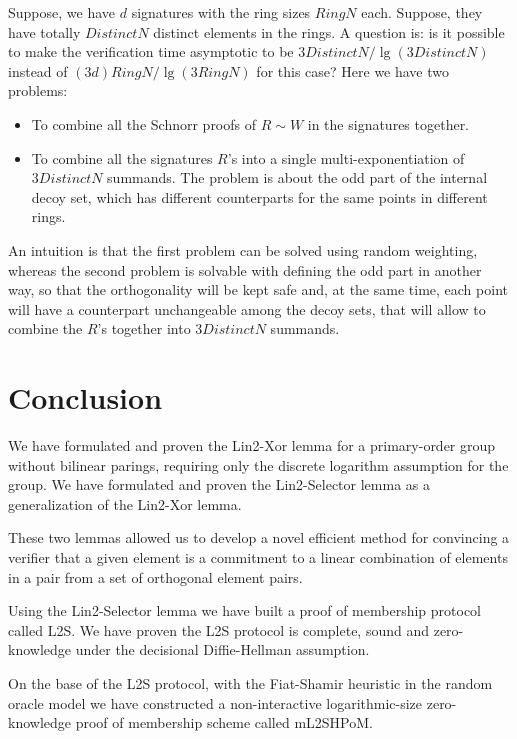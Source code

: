 \documentclass{mathcryptology} %
\newcommand{\RingN}{\textit{RingN}}
\theoremstyle{title}
\theoremstyle{titleof}
\begin{document}
    Suppose, we have $d$ signatures with the ring sizes $\RingN$ each. Suppose, they have totally $\textit{DistinctN}$ distinct elements in the rings. A question is: is it possible to make the verification time asymptotic to be $3\textit{DistinctN}/\lg\left( 3 \textit{DistinctN}\right)$ instead of $(3 d)\RingN/\lg\left(3\RingN\right)$ for this case? Here we have two problems:
    \begin{itemize}
        \item To combine all the Schnorr proofs of $R\sim W$ in the signatures together.
        \item To combine all the signatures $R$'s into a single multi-exponentiation of $3\textit{DistinctN}$ summands. The problem is about the odd part of the internal decoy set, which has different counterparts for the same points in different rings.
    \end{itemize}
    An intuition is that the first problem can be solved using random weighting, whereas the second problem is solvable with defining the odd part in another way, so that the orthogonality will be kept safe and, at the same time, each point will have a counterpart unchangeable among the decoy sets, that will allow to combine the $R$'s together into $3\textit{DistinctN}$ summands.


\section{Conclusion}
    We have formulated and proven the Lin2-Xor lemma for a primary-order group without bilinear parings, requiring only the discrete logarithm assumption for the group. We have formulated and proven the Lin2-Selector lemma as a generalization of the Lin2-Xor lemma.

    These two lemmas allowed us to develop a novel efficient method for convincing a verifier that a given element is a commitment to a linear combination of elements in a pair from a set of orthogonal element pairs.

    Using the Lin2-Selector lemma we have built a proof of membership protocol called L2S. We have proven the L2S protocol is complete, sound and zero-knowledge under the decisional Diffie-Hellman assumption.

    On the base of the L2S protocol, with the Fiat-Shamir heuristic in the random oracle model we have constructed a non-interactive logarithmic-size zero-knowledge proof of membership scheme called mL2SHPoM.
\end{document}
